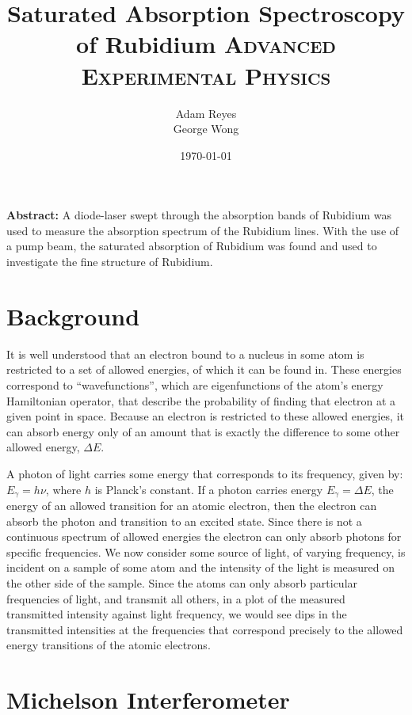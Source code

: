 \documentclass[paper=a4, fontsize=11pt]{scrartcl} %
\title{	
Saturated Absorption Spectroscopy of Rubidium
\horrule{0.5pt}
\normalfont \normalsize 
\textsc{Advanced Experimental Physics }
}
\author{Adam Reyes \\ George Wong} %
\date{\normalsize\today} %
\numberwithin{equation}{section}
\numberwithin{figure}{section}
\numberwithin{table}{section}
\begin{document}
\maketitle
\noindent\textbf{Abstract:}
A diode-laser swept through the absorption bands of Rubidium was used
to measure the absorption spectrum of the Rubidium lines. With the use
of a pump beam, the saturated absorption of Rubidium was found and
used to investigate the fine structure of Rubidium. 


\section{Background}


\indent It is well understood that an electron bound to a nucleus in some atom is restricted to a set of allowed energies, of which it can be found in. These energies correspond to ``wavefunctions'', which are eigenfunctions of the atom's energy Hamiltonian operator, that describe the probability of finding that electron at a given point in space. Because an electron is restricted to these allowed energies, it can absorb energy only of an amount that is exactly the difference to some other allowed energy, $\Delta E$. 

A photon of light carries some energy that corresponds to its frequency, given by: $E_\gamma = h\nu$, where $h$ is Planck's constant. If a photon carries energy $E_\gamma = \Delta E$, the energy of an allowed transition for an atomic electron, then the electron can absorb the photon and transition to an excited state. Since there is not a continuous spectrum of allowed energies the electron can only absorb photons for specific frequencies. We now consider some source of light, of varying frequency, is incident on a sample of some atom and the intensity of the light is measured on the other side of the sample. Since the atoms can only absorb particular frequencies of light, and transmit all others, in a plot of the measured transmitted intensity against light frequency, we would see dips in the transmitted intensities at the frequencies that correspond precisely to the allowed energy transitions of the atomic electrons. 





\section{Michelson Interferometer}
\end{document}
